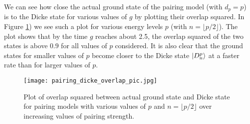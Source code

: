 \documentclass[10pt]{article}
\begin{document}
We can see how close the actual ground state of the pairing model (with $d_p=p$) is to the Dicke state for various values of $g$ by plotting their overlap squared. In Figure \ref{fig:pairing_dicke_overlap_pic}) we see such a plot for various energy levels $p$ (with $n=\lfloor p/2 \rfloor$). The plot shows that by the time $g$ reaches about 2.5, the overlap squared of the two states is above $0.9$ for all values of $p$ considered. It is also clear that the ground states for smaller values of $p$ become closer to the Dicke state $\ket{D^p_n}$ at a faster rate than for larger values of $p$.

\begin{figure}
    \centering
    \texttt{[image: pairing\_dicke\_overlap\_pic.jpg]}
    \caption{Plot of overlap squared between actual ground state and Dicke state for pairing models with various values of $p$ and $n=\lfloor p/2 \rfloor$ over increasing values of pairing strength.}
    \label{fig:pairing_dicke_overlap_pic}
\end{figure}
\end{document}
